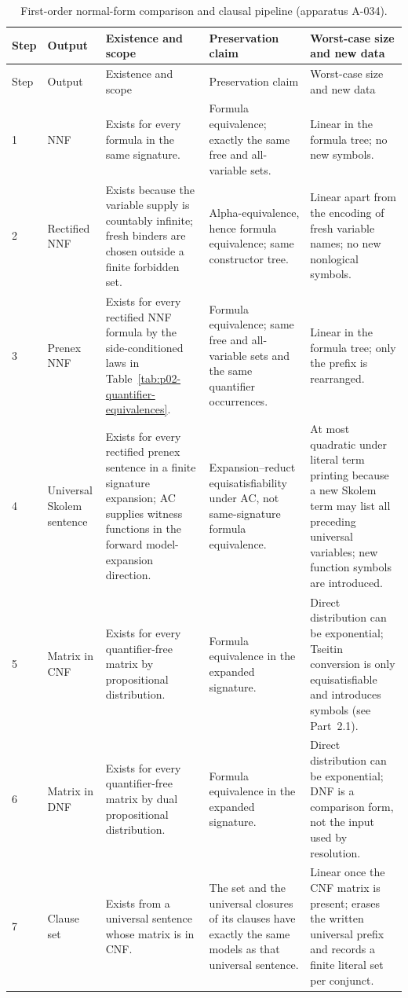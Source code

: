 \begin{landscape}
\begingroup\scriptsize\setlength{\tabcolsep}{3pt}
\begin{longtable}{@{}p{.30in}p{1.05in}p{1.65in}p{1.90in}p{2.00in}@{}}
\caption{First-order normal-form comparison and clausal pipeline (apparatus A-034).}
\label{tab:p02-fol-normal-form-pipeline}\\
\toprule
Step & Output & Existence and scope & Preservation claim & Worst-case size and new data \\ \midrule
\endfirsthead
\toprule Step & Output & Existence and scope & Preservation claim & Worst-case size and new data \\ \midrule
\endhead
1 & NNF & Exists for every formula in the same signature. & Formula
equivalence; exactly the same free and all-variable sets. & Linear in the
formula tree; no new symbols. \\
2 & Rectified NNF & Exists because the variable supply is countably infinite;
fresh binders are chosen outside a finite forbidden set. & Alpha-equivalence,
hence formula equivalence; same constructor tree. & Linear apart from the
encoding of fresh variable names; no new nonlogical symbols. \\
3 & Prenex NNF & Exists for every rectified NNF formula by the side-conditioned
laws in Table~\ref{tab:p02-quantifier-equivalences}. & Formula equivalence;
same free and all-variable sets and the same quantifier occurrences. & Linear
in the formula tree; only the prefix is rearranged. \\
4 & Universal Skolem sentence & Exists for every rectified prenex sentence in a
finite signature expansion; AC supplies witness functions in the forward
model-expansion direction. & Expansion--reduct equisatisfiability under AC,
not same-signature formula equivalence. & At most quadratic under literal term
printing because a new Skolem term may list all preceding universal variables;
new function symbols are introduced. \\
5 & Matrix in CNF & Exists for every quantifier-free matrix by propositional
distribution. & Formula equivalence in the expanded signature. & Direct
distribution can be exponential; Tseitin conversion is only equisatisfiable
and introduces symbols (see Part~2.1). \\
6 & Matrix in DNF & Exists for every quantifier-free matrix by dual
propositional distribution. & Formula equivalence in the expanded signature. &
Direct distribution can be exponential; DNF is a comparison form, not the
input used by resolution. \\
7 & Clause set & Exists from a universal sentence whose matrix is in CNF. & The
set and the universal closures of its clauses have exactly the same models as
that universal sentence. & Linear once the CNF matrix is present; erases the
written universal prefix and records a finite literal set per conjunct. \\
\bottomrule
\end{longtable}
\endgroup
\end{landscape}

